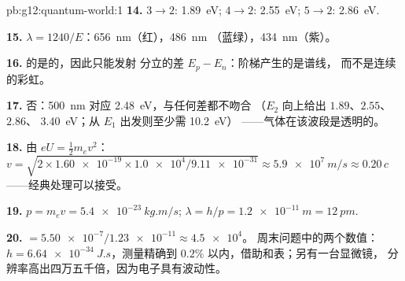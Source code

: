 \begin{solution}{pb:g12:quantum-world:1}
\textbf{14.} $3 \to 2$: \qty{1.89}{eV}; $4 \to 2$: \qty{2.55}{eV};
$5 \to 2$: \qty{2.86}{eV}.

\textbf{15.} $\lambda = 1240/E$：\qty{656}{nm}（红），\qty{486}{nm}
（蓝绿），\qty{434}{nm}（紫）。

\textbf{16.} 的是的，因此只能发射
分立的差 $E_p - E_n$：阶梯产生的是谱线，
而不是连续的彩虹。

\textbf{17.} 否：\qty{500}{nm} 对应 \qty{2.48}{eV}，与任何差都不吻合
（$E_2$ 向上给出 $1.89$、$2.55$、$2.86$、
\qty{3.40}{eV}；从 $E_1$ 出发则至少需 \qty{10.2}{eV}）
——气体在该波段是透明的。

\textbf{18.} 由 $eU = \tfrac12 m_e v^2$：$v = \sqrt{2 \times
\num{1.60e-19} \times \num{1.0e4}/\num{9.11e-31}} \approx
\qty{5.9e7}{m/s} \approx 0.20\,c$——经典处理可以接受。

\textbf{19.} $p = m_e v = \qty{5.4e-23}{kg.m/s}$;
$\lambda = h/p = \qty{1.2e-11}{m} = \qty{12}{pm}$.

\textbf{20.}  $= \num{5.50e-7}/\num{1.23e-11} \approx \num{4.5e4}$。
周末问题中的两个数值：$h = \qty{6.64e-34}{J.s}$，测量精确到
$0.2\%$ 以内，借助和表；另有一台显微镜，
分辨率高出四万五千倍，因为电子具有波动性。
\end{solution}

